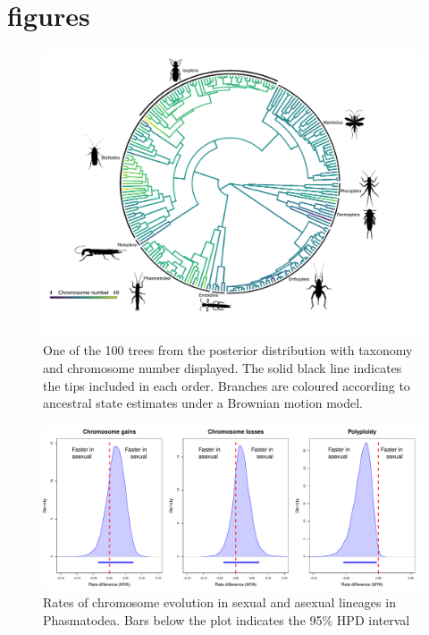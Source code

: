 \section{figures}

\begin{figure}[h]
\centering \includegraphics[width=1\textwidth]{figures/phylogenetic_tree.pdf}
\caption{One of the 100 trees from the posterior distribution with taxonomy and chromosome number displayed. The solid black line indicates the tips included in each order. Branches are coloured according to ancestral state estimates under a Brownian motion model. 
}
\label{fig:phyloplot}
\end{figure}

\begin{figure}
\centering \includegraphics[width=1\textwidth]{figures/phasmatodea_sex_asex_plot.pdf}
\caption{
Rates of chromosome evolution in sexual and asexual lineages in Phasmatodea. 
Bars below the plot indicates the 95\% HPD interval}
\label{fig:phas.plot}
\end{figure}

